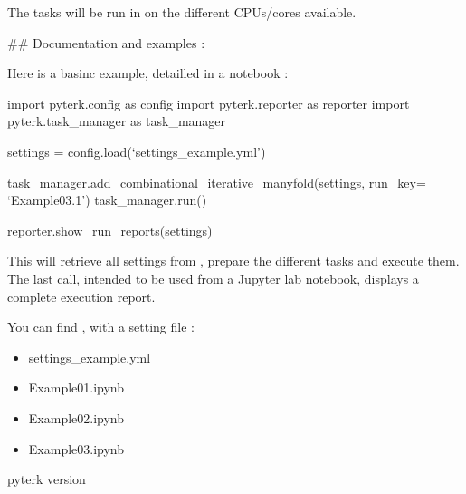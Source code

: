 \documentclass[letterpaper,10pt,english]{sphinxmanual}
\begin{document}
\sphinxAtStartPar
The tasks will be run in  on the different CPUs/cores available.

\sphinxAtStartPar
\#\# Documentation and examples :

\sphinxAtStartPar
Here is a basinc example, detailled in a notebook :

\sphinxAtStartPar
{\color{red}\bfseries{}\textasciigrave{}\textasciigrave{}}\textasciigrave{}
import pyterk.config       as config
import pyterk.reporter     as reporter
import pyterk.task\_manager as task\_manager

\sphinxAtStartPar
settings = config.load(‘settings\_example.yml’)

\sphinxAtStartPar
task\_manager.add\_combinational\_iterative\_manyfold(settings, run\_key= ‘Example\sphinxhyphen{}03.1’)
task\_manager.run()

\sphinxAtStartPar
reporter.show\_run\_reports(settings)
{\color{red}\bfseries{}\textasciigrave{}\textasciigrave{}}{\color{red}\bfseries{}\textasciigrave{}}

\sphinxAtStartPar
This will retrieve all settings from , prepare the different tasks and execute them.
The last call, intended to be used from a Jupyter lab notebook, displays a complete execution report.

\sphinxAtStartPar
You can find , with a setting file :
\begin{itemize}
\item {} 
\sphinxAtStartPar
settings\_example.yml

\item {} 
\sphinxhyphen{}Example\sphinxhyphen{}01.ipynb

\item {} 
\sphinxhyphen{}Example\sphinxhyphen{}02.ipynb

\item {} 
\sphinxhyphen{}Example\sphinxhyphen{}03.ipynb

\end{itemize}

\begin{fulllineitems}
\label{\detokenize{pyterk:pyterk.VERSION}}
\sphinxAtStartPar
pyterk version

\end{fulllineitems}
\end{document}
